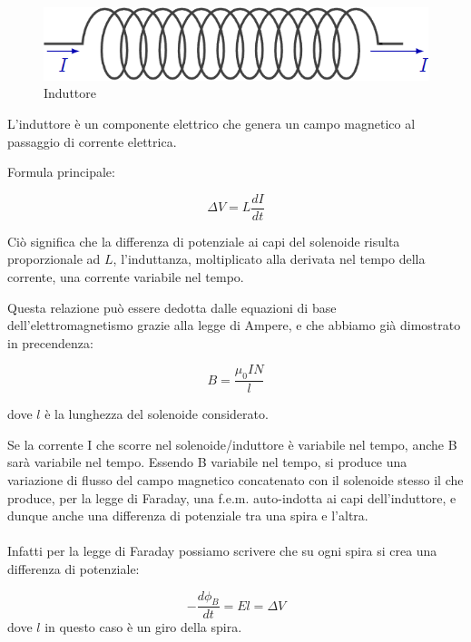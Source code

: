 \begin{figure}[H]
    \centering
    \includegraphics[scale = 0.4]{image/solenoide.png}
    \caption{Induttore}
    \label{Induttore}
\end{figure}

L'induttore è un componente elettrico che genera un campo magnetico al passaggio di corrente elettrica.

Formula principale:

\begin{equation}
    \Delta V = L \frac{dI}{dt}
\end{equation}

Ciò significa che la differenza di potenziale ai capi del solenoide risulta proporzionale ad $L$, l'induttanza, moltiplicato alla derivata nel tempo della corrente, una corrente variabile nel tempo.

Questa relazione può essere dedotta dalle equazioni di base dell'elettromagnetismo grazie alla legge di Ampere, e che abbiamo già dimostrato in precendenza:

\begin{equation}
    B = \frac{\mu_0IN}{l}
\end{equation}

dove $l$ è la lunghezza del solenoide considerato.


Se la corrente I che scorre nel solenoide/induttore è variabile nel tempo, anche B sarà variabile nel tempo. Essendo B variabile nel tempo, si produce una variazione di flusso del campo magnetico concatenato con il solenoide stesso il che produce, per la legge di Faraday, una f.e.m. auto-indotta ai capi dell'induttore, e dunque anche una differenza di potenziale tra una spira e l'altra.

\paragraph{}
Infatti per la legge di Faraday possiamo scrivere che su ogni spira si crea una differenza di potenziale:

\begin{equation*}
    -\frac{d \phi_B}{dt} = El = \Delta V
\end{equation*}
dove $l$ in questo caso è un giro della spira.

